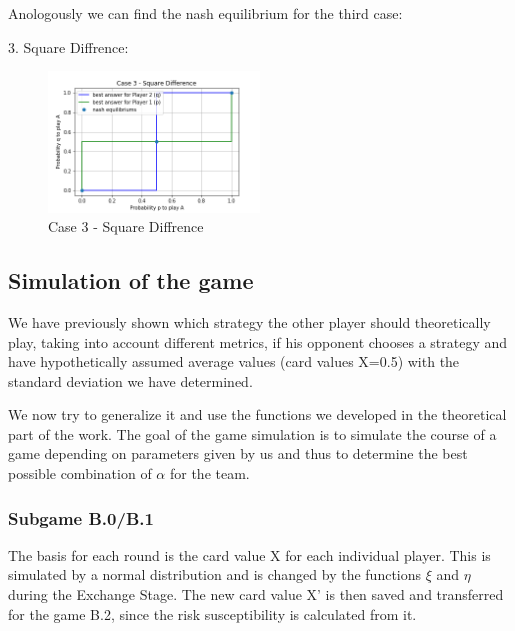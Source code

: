 Anologously we can find the nash equilibrium for the third case:

3. Square Diffrence: \\
\begin{figure}[!ht]
    \centering
    \includegraphics[width=0.5\textwidth]{Bilder/5_diff}
    \caption{Case 3 - Square Diffrence}
    \label{fig:16}
\end{figure}
\subsection{Simulation of the game}
We have previously shown which strategy the other player should theoretically play, taking into account different metrics, if his opponent chooses a strategy and have hypothetically assumed average values (card values X=0.5) with the standard deviation we have determined.

We now try to generalize it and use the functions we developed in the theoretical part of the work. The goal of the game simulation is to simulate the course of a game depending on parameters given by us and thus to determine the best possible combination of $\alpha$ for the team.

\subsubsection{Subgame B.0/B.1}
The basis for each round is the card value X for each individual player. This is simulated by a normal distribution and is changed by the functions $\xi$ and $\eta$ during the Exchange Stage. The new card value X' is then saved and transferred for the game B.2, since the risk susceptibility is calculated from it.

